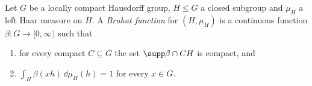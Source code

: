 Let $G$ be a locally compact Hausdorff group, $H\le G$ a closed subgroup and $\mu_H$ a left Haar measure on $H$. A
\emph{Bruhat function} for $(H,\mu_H)$ is a continuous function $\beta\colon G\to[0,\infty)$ such that
\begin{enumerate}
  \item[(i)] for every compact $C\subseteq G$ the set $\supp\beta\cap CH$ is compact, and
  \item[(ii)] $\int_H\beta(xh)\,\dd\mu_H(h)=1$ for every $x\in G$.
\end{enumerate}
